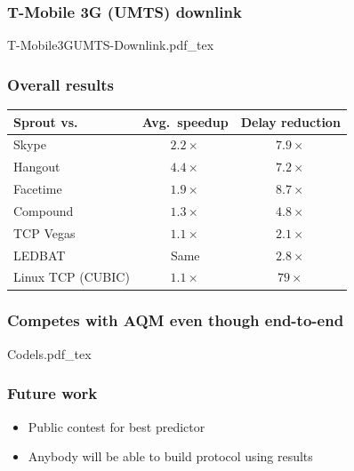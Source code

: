 \documentclass[svgnames]{beamer}
\begin{document}
\begin{frame}
\frametitle{T-Mobile 3G (UMTS) downlink}
\vspace{-1 cm}
\def\svgwidth{\columnwidth}\footnotesize{T-Mobile3GUMTS-Downlink.pdf_tex}
\end{frame}

\begin{frame}
\frametitle{Overall results}

\begin{tabular}{|l|c|c|}
\hline
{\color{blue}Sprout} vs.~ & Avg.~speedup & Delay reduction \\
\hline
\hline
{\color{red}Skype} & $2.2\times$ & $7.9\times$ \\
{\color{red}Hangout} & $4.4\times$ & $7.2\times$ \\
{\color{red}Facetime} & $1.9\times$ & $8.7\times$ \\
\hline
{\color{ForestGreen}Compound} & $1.3\times$ & $4.8\times$ \\
{\color{ForestGreen}TCP Vegas} & $1.1\times$ & $2.1\times$ \\
{\color{ForestGreen}LEDBAT} & Same & $2.8\times$ \\
{\color{ForestGreen}Linux TCP (CUBIC)} & $1.1\times$ & $79\times$ \\
\hline
\end{tabular}

\end{frame}

\begin{frame}
\frametitle{Competes with AQM even though end-to-end}
\vspace{-1 cm}
\def\svgwidth{\columnwidth}\footnotesize{Codels.pdf_tex}
\end{frame}

\begin{frame}
\frametitle{Future work}

\begin{itemize}
\item Public contest for best predictor
\item Anybody will be able to build protocol using results
\end{itemize}
\end{frame}
\end{document}
